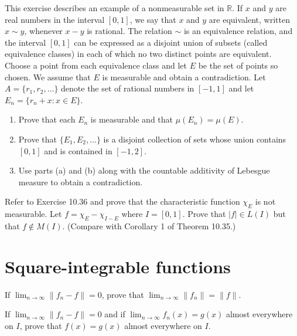 \begin{problembox}
This exercise describes an example of a nonmeasurable set in $\mathbb{R}$. If $x$ and $y$ are real numbers in the interval $[0, 1]$, we say that $x$ and $y$ are equivalent, written $x \sim y$, whenever $x - y$ is rational. The relation $\sim$ is an equivalence relation, and the interval $[0, 1]$ can be expressed as a disjoint union of subsets (called equivalence classes) in each of which no two distinct points are equivalent. Choose a point from each equivalence class and let $E$ be the set of points so chosen. We assume that $E$ is measurable and obtain a contradiction. Let $A = \{r_1, r_2, \ldots \}$ denote the set of rational numbers in $[-1, 1]$ and let $E_n = \{r_n + x : x \in E\}$.
\begin{enumerate}[label=(\alph*)]
    \item Prove that each $E_n$ is measurable and that $\mu(E_n) = \mu(E)$.
    \item Prove that $\{E_1, E_2, \ldots \}$ is a disjoint collection of sets whose union contains $[0, 1]$ and is contained in $[-1, 2]$.
    \item Use parts (a) and (b) along with the countable additivity of Lebesgue measure to obtain a contradiction.
\end{enumerate}
\end{problembox}

\begin{problembox}
Refer to Exercise 10.36 and prove that the characteristic function $\chi_E$ is not measurable. Let $f = \chi_E - \chi_{I-E}$ where $I = [0, 1]$. Prove that $|f| \in L(I)$ but that $f \notin M(I)$. (Compare with Corollary 1 of Theorem 10.35.)
\end{problembox}

\section{Square-integrable functions}

\begin{problembox}
If $\lim_{n \to \infty} \| f_n - f \| = 0$, prove that $\lim_{n \to \infty} \| f_n \| = \| f \|$.
\end{problembox}

\begin{problembox}
If $\lim_{n \to \infty} \| f_n - f \| = 0$ and if $\lim_{n \to \infty} f_n(x) = g(x)$ almost everywhere on $I$, prove that $f(x) = g(x)$ almost everywhere on $I$.
\end{problembox}

